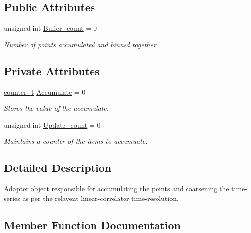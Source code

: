 \subsection*{Public Attributes}
\begin{DoxyCompactItemize}
\item 
unsigned int \hyperlink{classAccumulator_a6e4595169413a77122fe56cdd39137ae}{Buffer\+\_\+count} = 0
\begin{DoxyCompactList}\small\item\em Number of points accumulated and binned together. \end{DoxyCompactList}\end{DoxyCompactItemize}
\subsection*{Private Attributes}
\begin{DoxyCompactItemize}
\item 
\hyperlink{types_8hpp_a22f279793847eba127de149437848c48}{counter\+\_\+t} \hyperlink{classAccumulator_a8e615af8b85dd2c8500d1f8c473879ab}{Accumulate} = 0
\begin{DoxyCompactList}\small\item\em Stores the value of the accumulate. \end{DoxyCompactList}\item 
unsigned int \hyperlink{classAccumulator_afb010cbe82265d22e5d577033574a16b}{Update\+\_\+count} = 0
\begin{DoxyCompactList}\small\item\em Maintains a counter of the items to accumuate. \end{DoxyCompactList}\end{DoxyCompactItemize}


\subsection{Detailed Description}
Adapter object responsible for accumulating the points and coarsening the time-\/series as per the relavent linear-\/correlator time-\/resolution. 

\subsection{Member Function Documentation}
\mbox{\label{classAccumulator_adab342ee6d376a45ed38fe1e1679a1e2}} 
